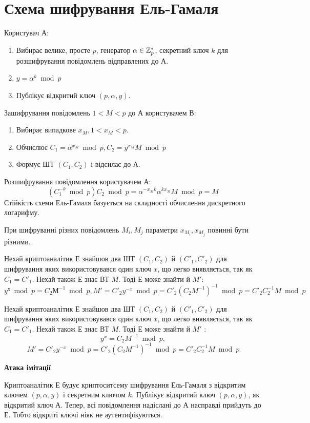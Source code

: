 \section{Схема шифрування Ель-Гамаля}
Користувач А:
\begin{enumerate}
\item 
Вибирає велике, просте  $p$, генератор $\alpha \in \mathbb Z^{*}_{p}$, 
секретний ключ $k$ для розшифрування повідомлень відправлених до А.
\item 
$ y=\alpha^k\bmod{p}$
\item 
Публікує відкритий ключ $(p, \alpha, y)$.
\end{enumerate}
Зашифрування повідомлень $1<M<p$ до А користувачем В:
\begin{enumerate}
\item 
Вибирає випадкове $x_{M}, 1<x_{M}<p$. 
\item 
Обчислює $C_{1}=\alpha^{x_{M}}\bmod{p}, C_{2}=y^{x_{M}}M\bmod{p}$
\item
Формує ШТ $(C_{1},  C_{2})$ і відсилає до А.
\end{enumerate}
Розшифрування повідомлення користувачем А:
\[ (C_{1}^{-k}\bmod{p})C_{2}\bmod{p}= \alpha^{-x_{M}k}\alpha^{kx_{M}}M\bmod{p}=M \]
Стійкість схеми Ель-Гамаля базується на складності обчислення дискретного логарифму.\par
\begin{remark}
При шифруванні різних повідомлень $M_{i}, M_{j}$ параметри $x_{M_{i}}, x_{M_{j}}$ повинні бути різними.

Нехай криптоаналітик Е знайшов два ШТ $(C_{1},  C_{2})$ й $(C'_{1},  C'_{2})$ для шифрування яких використовувався один ключ $x$, що легко виявляється, так як  $C_{1}=C'_{1}$.
Нехай також Е знає ВТ $M$. Тоді Е може знайти й $M'$: $$ y^{х}\bmod{p}=C_{2}М^{-1}\bmod{p}, M'=C'_{2}y^{-x}\bmod{p}=C'_{2}(C_{2}M^{-1})^{-1}\bmod{p}=C'_{2}C_{2}^{-1}M\bmod{p}$$

Нехай криптоаналітик Е знайшов два ШТ \( (C_{1},  C_{2}) \) й \( (C'_{1},  C'_{2}) \) для шифрування яких використовувався один ключ $x$, що легко виявляється, так як  \(C_{1}=C'_{1}\).
Нехай також Е знає ВТ \(M\). Тоді Е може знайти й \( M' \) : 
\[ y^x = C_2 M^{-1} \bmod{p},\]
\[M'=C'_{2}y^{-x}\bmod{p}=C'_{2}(C_{2} M^{-1})^{-1}\bmod{p}=C'_{2}C_{2}^{-1} M \bmod{p} \]

\end{remark}
\textbf{Атака імітації}\par
Криптоаналітик Е будує криптоситсему шифрування Ель-Гамаля з відкритим ключем $(p,\alpha,y)$ і секретним ключом $k$.
Публікує відкритий ключ $(p,\alpha,y)$, як відкритий ключ А. Тепер, всі повідомлення надіслані до А насправді прийдуть до Е.
Тобто відкриті ключі ніяк не аутентифікуються.\par


